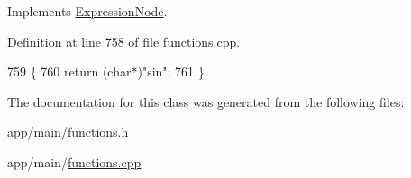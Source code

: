 Implements \hyperlink{classExpressionNode_a42a5e9562b0f645a19dcc83f698069b5}{Expression\+Node}.



Definition at line 758 of file functions.\+cpp.


\begin{DoxyCode}
759 \{
760     \textcolor{keywordflow}{return} (\textcolor{keywordtype}{char}*)\textcolor{stringliteral}{"sin"};
761 \}
\end{DoxyCode}


The documentation for this class was generated from the following files\+:\begin{DoxyCompactItemize}
\item 
app/main/\hyperlink{functions_8h}{functions.\+h}\item 
app/main/\hyperlink{functions_8cpp}{functions.\+cpp}\end{DoxyCompactItemize}
